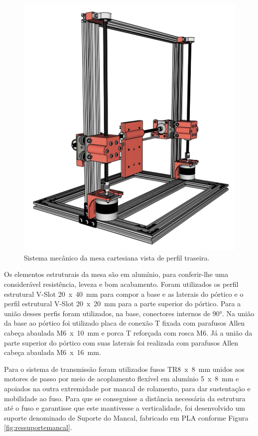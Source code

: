 \begin{figure}[H]
\centering
\caption{Sistema mecânico da mesa cartesiana vista de perfil traseira.}\label{fig:mesacartesianaperfiltraseira}
\includegraphics[scale = 0.35]{figuras/mesacartesianaperfiltraseira}
\end{figure}
                
Os elementos estruturais da mesa são em alumínio, para conferir-lhe uma considerável resistência, 
leveza e bom acabamento. Foram utilizados os perfil estrutural V-Slot 20~x~40~mm para compor a base 
e as laterais do pórtico e o perfil estrutural V-Slot 20~x~20~mm para a parte superior do pórtico. 
Para a união desses perfis foram utilizados, na base, conectores internos de 90°. Na união da 
base ao pórtico foi utilizado placa de conexão T fixada com parafusos Allen cabeça abaulada 
M6~x~10~mm e porca T reforçada com rosca M6. Já a união da parte superior do pórtico com suas laterais foi 
realizada com parafusos Allen cabeça abaulada M6~x~16~mm.

\pagebreak
Para o sistema de transmissão foram utilizados fusos TR8~x~8~mm unidos aos motores de passo 
por meio de acoplamento flexível em alumínio 5~x~8~mm e apoiados na outra extremidade por 
mancal de rolamento, para dar sustentação e mobilidade ao fuso. Para que se conseguisse 
a distância necessária da estrutura até o fuso e garantisse que este mantivesse a 
verticalidade, foi desenvolvido um suporte denominado de Suporte do Mancal, fabricado 
em \ac{PLA} conforme Figura \ref{fig:ressuportemancal}.

